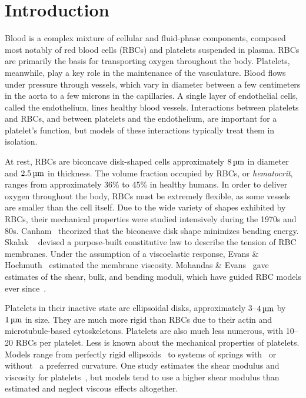 \section{Introduction}

Blood is a complex mixture of cellular and fluid-phase components, composed most notably of red blood cells (RBCs)
and platelets suspended in plasma. RBCs are primarily the basis for transporting oxygen throughout the body.
Platelets, meanwhile, play a key role in the maintenance of the vasculature. Blood flows under pressure through
vessels, which vary in diameter between a few centimeters in the aorta to a few microns in the capillaries. A
single layer of endothelial cells, called the endothelium, lines healthy blood vessels.  Interactions between
platelets and RBCs, and between platelets and the endothelium, are important for a platelet's function, but models
of these interactions typically treat them in isolation.

At rest, RBCs are biconcave disk-shaped cells approximately $8\um$ in diameter and $2.5\um$ in thickness. The
volume fraction occupied by RBCs, or \emph{hematocrit}, ranges from approximately 36\% to 45\% in healthy humans.
In order to deliver oxygen throughout the body, RBCs must be extremely flexible, as some vessels are smaller than
the cell itself. Due to the wide variety of shapes exhibited by RBCs, their mechanical properties were studied
intensively during the 1970s and 80s. Canham~\cite{Canham:1970wx} theorized that the biconcave disk shape
minimizes bending energy. Skalak ~\cite{Skalak:1973tp} devised a purpose-built constitutive law to
describe the tension of RBC membranes. Under the assumption of a viscoelastic response, Evans \& Hochmuth~%
\cite{Evans:1976tx} estimated the membrane viscosity. Mohandas \& Evans~\cite{Mohandas:1994tg} gave estimates of
the shear, bulk, and bending moduli, which have guided RBC models ever since~\cite{Pozrikidis:2003ft, Fai:2013do}.

Platelets in their inactive state are ellipsoidal disks, approximately 3--$4\um$ by $1\um$ in size. They are much
more rigid than RBCs due to their actin and microtubule-based cytoskeletons. Platelets are also much less
numerous, with 10--20 RBCs per platelet. Less is known about the mechanical properties of platelets. Models range
from perfectly rigid ellipsoids~\cite{Wang:2013gs} to systems of springs with~\cite{Erickson:2010ep,
Skorczewski:2013jn} or without~\cite{Wu:2014gt} a preferred curvature. One study estimates the shear modulus and
viscosity for platelets~\cite{Haga:1998wa}, but models tend to use a higher shear modulus than estimated and
neglect viscous effects altogether.

